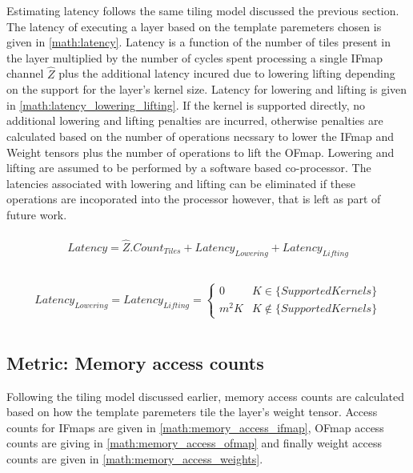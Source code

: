 Estimating latency follows the same tiling model discussed the previous
section. The latency of executing a layer based on the template paremeters
chosen is given in \autoref{math:latency}. Latency is a function of the number of
tiles present in the layer multiplied by the number of cycles spent processing a
single IFmap channel $\hat{Z}$ plus the additional latency incured due to
lowering lifting depending on the support for the layer's kernel size. Latency
for lowering and lifting is given in \autoref{math:latency_lowering_lifting}. If
the kernel is supported directly, no additional lowering and lifting penalties
are incurred, otherwise penalties are calculated based on the number of
operations necssary to lower the IFmap and Weight tensors plus the number of
operations to lift the OFmap. Lowering and lifting are assumed to be performed
by a software based co-processor. The latencies associated with lowering and
lifting can be eliminated if these operations are incoporated into the processor
however, that is left as part of future work. 

\begin{align}
    \begin{gathered}
        Latency = \hat{Z}.Count_{Tiles} + Latency_{Lowering} + Latency_{Lifting} \\
                \end{gathered}
    \label{math:latency}
\end{align}

\begin{align}
    \begin{gathered}
        Latency_{Lowering} = Latency_{Lifting} = \begin{cases} 0 &  K \in \{SupportedKernels\}\\ m^{2}K & K \notin \{SupportedKernels\}\end{cases} \\
                \end{gathered}
    \label{math:latency_lowering_lifting}
\end{align}

\subsection{Metric: Memory access counts}
\label{chap:dataflow_dse:exploring:tempo_model:access_counts}

Following the tiling model discussed earlier, memory access counts are
calculated based on how the template paremeters tile the layer's weight tensor.
Access counts for IFmaps are given in \autoref{math:memory_access_ifmap}, OFmap
access counts are giving in \autoref{math:memory_access_ofmap} and finally
weight access counts are given in \autoref{math:memory_access_weights}.

